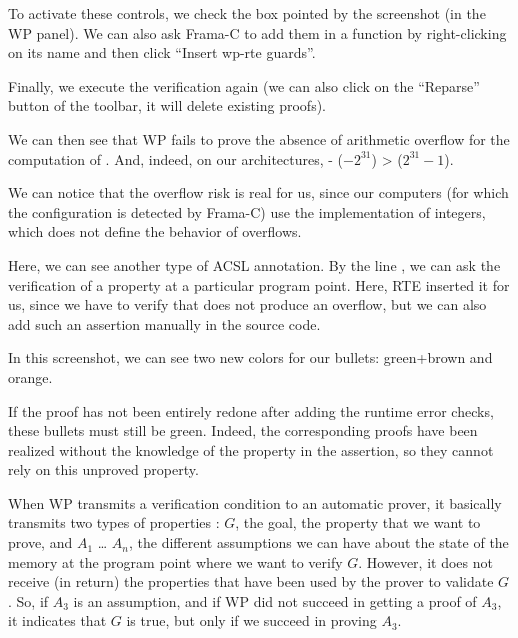 To activate these controls, we check the box pointed by the screenshot (in
the WP panel). We can also ask Frama-C to add them in a function by
right-clicking on its name and then click ``Insert wp-rte guards''.





Finally, we execute the verification again (we can also click on the
``Reparse'' button of the toolbar, it will delete existing proofs).

We can then see that WP fails to prove the absence of arithmetic
overflow for the computation of . And, indeed, on our
architectures, - ($-2^{31}$) >  ($2^{31}-1$).





\begin{Information}
We can notice that the overflow risk
is real for us, since our computers (for which the
configuration is detected by Frama-C) use the 
implementation of integers, which does not define
the behavior of overflows.
\end{Information}


Here, we can see another type of ACSL annotation. By the line
, we can ask the verification of a
property at a particular program point. Here, RTE inserted it for us, since
we have to verify that  does not produce an overflow, but
we can also add such an assertion manually in the source code.



In this screenshot, we can see two new colors for our bullets:
green+brown and orange.



If the proof has not been entirely redone after adding the runtime error
checks, these bullets must still be green. Indeed, the corresponding
proofs have been realized without the knowledge of the property in the
assertion, so they cannot rely on this unproved property.



When WP transmits a verification condition to an automatic prover, it
basically transmits two types of properties : $G$, the goal, the
property that we want to prove, and $A_1$ \ldots{} $A_n$, the
different assumptions we can have about the state of the memory at the
program point where we want to verify $G$. However, it does not
receive (in return) the properties that have been used by the prover to
validate $G$. So, if $A_3$ is an assumption, and if WP did not
succeed in getting a proof of $A_3$, it indicates that $G$ is true,
but only if we succeed in proving $A_3$.



